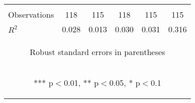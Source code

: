 \begin{center}
\begin{tabular}{lccccc}
\vspace{4pt} & \begin{footnotesize}\end{footnotesize} & \begin{footnotesize}\end{footnotesize} & \begin{footnotesize}\end{footnotesize} & \begin{footnotesize}\end{footnotesize} & \begin{footnotesize}\end{footnotesize} \\
Observations & 118 & 115 & 118 & 115 & 115 \\
 $R^2$ & 0.028 & 0.013 & 0.030 & 0.031 & 0.316 \\ \hline
\multicolumn{6}{c}{\begin{footnotesize} Robust standard errors in parentheses\end{footnotesize}} \\
\multicolumn{6}{c}{\begin{footnotesize} *** p$<$0.01, ** p$<$0.05, * p$<$0.1\end{footnotesize}} \\
\end{tabular}
\end{center}
